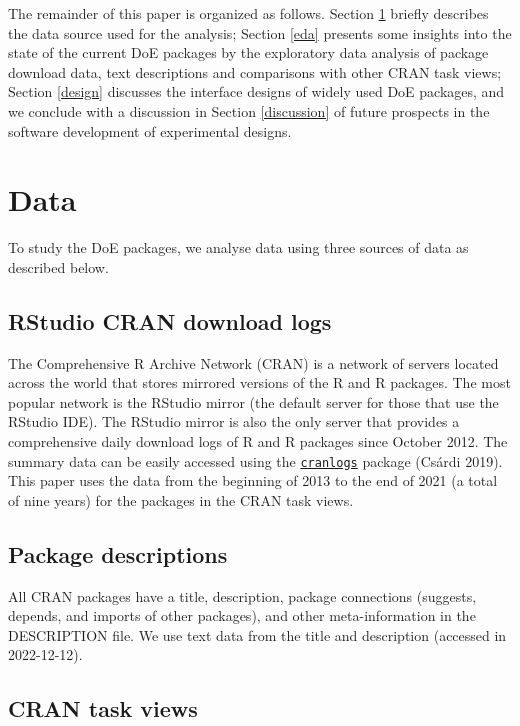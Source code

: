 \documentclass{article}
\begin{document}
The remainder of this paper is organized as follows. Section \ref{data}
briefly describes the data source used for the analysis; Section
\ref{eda} presents some insights into the state of the current DoE
packages by the exploratory data analysis of package download data, text
descriptions and comparisons with other CRAN task views; Section
\ref{design} discusses the interface designs of widely used DoE
packages, and we conclude with a discussion in Section \ref{discussion}
of future prospects in the software development of experimental designs.

\hypertarget{data}{%
\section{Data}\label{data}}

To study the DoE packages, we analyse data using three sources of data
as described below.

\hypertarget{rstudio-cran-download-logs}{%
\subsection{RStudio CRAN download
logs}\label{rstudio-cran-download-logs}}

The Comprehensive R Archive Network (CRAN) is a network of servers
located across the world that stores mirrored versions of the R and R
packages. The most popular network is the RStudio mirror (the default
server for those that use the RStudio IDE). The RStudio mirror is also
the only server that provides a comprehensive daily download logs of R
and R packages since October 2012. The summary data can be easily
accessed using the
\href{https://cran.r-project.org/web/packages/cranlogs/index.html}{\texttt{cranlogs}}
package (Csárdi 2019). This paper uses the data from the beginning of
2013 to the end of 2021 (a total of nine years) for the packages in the
CRAN task views.

\hypertarget{package-descriptions}{%
\subsection{Package descriptions}\label{package-descriptions}}

All CRAN packages have a title, description, package connections
(suggests, depends, and imports of other packages), and other
meta-information in the DESCRIPTION file. We use text data from the
title and description (accessed in 2022-12-12).

\hypertarget{cran-task-views}{%
\subsection{CRAN task views}\label{cran-task-views}}
\end{document}
